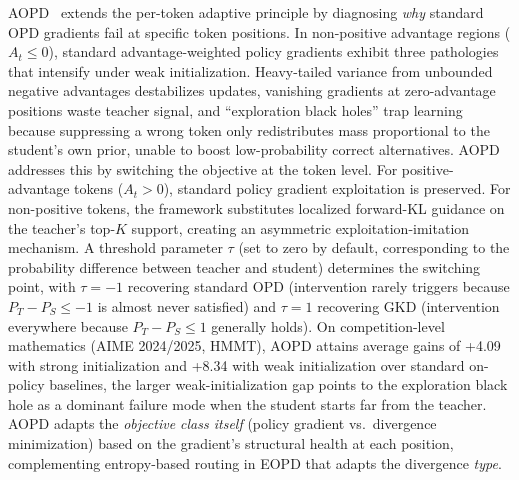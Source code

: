 \documentclass{article} %
\begin{document}
AOPD~\citep{2605.06387} extends the per-token adaptive principle by diagnosing \emph{why} standard OPD gradients fail at specific token positions. In non-positive advantage regions ($A_t \le 0$), standard advantage-weighted policy gradients exhibit three pathologies that intensify under weak initialization. Heavy-tailed variance from unbounded negative advantages destabilizes updates, vanishing gradients at zero-advantage positions waste teacher signal, and ``exploration black holes'' trap learning because suppressing a wrong token only redistributes mass proportional to the student's own prior, unable to boost low-probability correct alternatives. AOPD addresses this by switching the objective at the token level. For positive-advantage tokens ($A_t > 0$), standard policy gradient exploitation is preserved. For non-positive tokens, the framework substitutes localized forward-KL guidance on the teacher's top-$K$ support, creating an asymmetric exploitation-imitation mechanism. A threshold parameter $\tau$ (set to zero by default, corresponding to the probability difference between teacher and student) determines the switching point, with $\tau = -1$ recovering standard OPD (intervention rarely triggers because $P_T - P_S \le -1$ is almost never satisfied) and $\tau = 1$ recovering GKD (intervention everywhere because $P_T - P_S \le 1$ generally holds). On competition-level mathematics (AIME 2024/2025, HMMT), AOPD attains average gains of +4.09 with strong initialization and +8.34 with weak initialization over standard on-policy baselines, the larger weak-initialization gap points to the exploration black hole as a dominant failure mode when the student starts far from the teacher. AOPD adapts the \emph{objective class itself} (policy gradient vs.\ divergence minimization) based on the gradient's structural health at each position, complementing entropy-based routing in EOPD that adapts the divergence \emph{type}.
\end{document}
